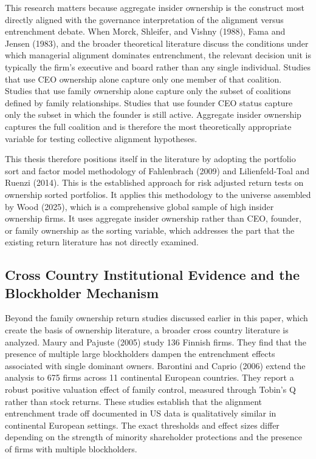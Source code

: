 This research matters because aggregate insider ownership is the construct most directly aligned with the governance interpretation of the alignment versus entrenchment debate. When Morck, Shleifer, and Vishny (1988), Fama and Jensen (1983), and the broader theoretical literature discuss the conditions under which managerial alignment dominates entrenchment, the relevant decision unit is typically the firm's executive and board rather than any single individual. Studies that use CEO ownership alone capture only one member of that coalition. Studies that use family ownership alone capture only the subset of coalitions defined by family relationships. Studies that use founder CEO status capture only the subset in which the founder is still active. Aggregate insider ownership captures the full coalition and is therefore the most theoretically appropriate variable for testing collective alignment hypotheses.

This thesis therefore positions itself in the literature by adopting the portfolio sort and factor model methodology of Fahlenbrach (2009) and Lilienfeld-Toal and Ruenzi (2014). This is the established approach for risk adjusted return tests on ownership sorted portfolios. It applies this methodology to the universe assembled by Wood (2025), which is a comprehensive global sample of high insider ownership firms. It uses aggregate insider ownership rather than CEO, founder, or family ownership as the sorting variable, which addresses the part that the existing return literature has not directly examined.


\subsection{Cross Country Institutional Evidence and the Blockholder Mechanism}

Beyond the family ownership return studies discussed earlier in this paper, which create the basis of ownership literature, a broader cross country literature is analyzed. Maury and Pajuste (2005) study 136 Finnish firms. They find that the presence of multiple large blockholders dampen the entrenchment effects associated with single dominant owners. Barontini and Caprio (2006) extend the analysis to 675 firms across 11 continental European countries. They report a robust positive valuation effect of family control, measured through Tobin's Q rather than stock returns. These studies establish that the alignment entrenchment trade off documented in US data is qualitatively similar in continental European settings. The exact thresholds and effect sizes differ depending on the strength of minority shareholder protections and the presence of firms with multiple blockholders.

